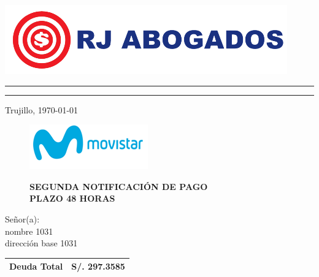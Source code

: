 %
%

\begin{flushleft}
\includegraphics[natwidth=12.170833333cm, natheight=2.989791667cm]{resources/logo.png}
\end{flushleft}
\vspace{-0.8cm}
\textcolor[rgb]{1.00,0.00,0.00}{
\hrule
\hrule
}

\begin{flushright}
    Trujillo, \today
\end{flushright}
\vspace{-0.5cm}

\begin{figure}[h]
\begin{minipage}[b]{5.106458333cm}
\includegraphics[natwidth=5.106458333cm, natheight=1.931458333cm]{resources/business_logo.png}
\end{minipage}
\begin{minipage}[b][1.9314cm][t]{11cm}
\begin{flushright}
{\LARGE \bf SEGUNDA NOTIFICACIÓN DE PAGO\\PLAZO 48 HORAS}
\end{flushright}
\end{minipage}
\end{figure}

\noindent
Señor(a):\\
nombre 1031\\
dirección base 1031

\begin{flushright}
\bf \large
\begin{tabular}{|p{3.2cm} p{3.2cm}|}
\hline
Deuda Total & S/. 297.3585 \\
\hline
\end{tabular}
\end{flushright}

